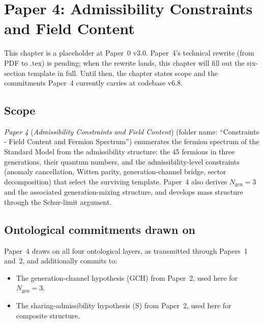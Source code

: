 \documentclass[11pt]{article}
\newcommand{\paperref}[2]{\emph{Paper #1} (\emph{#2})}
\begin{document}
\clearpage

\section{Paper 4: Admissibility Constraints and Field Content}\label{sec:P4}

\begin{tcolorbox}[pendingbox, title={Status: placeholder chapter}]
This chapter is a placeholder at Paper~0 v3.0. Paper~4's technical rewrite (from PDF to .tex) is pending; when the rewrite lands, this chapter will fill out the six-section template in full. Until then, the chapter states scope and the commitments Paper~4 currently carries at codebase v6.8.
\end{tcolorbox}

\subsection{Scope}\label{sec:P4_scope}

\paperref{4}{Admissibility Constraints and Field Content} (folder name: ``Constraints - Field Content and Fermion Spectrum'') enumerates the fermion spectrum of the Standard Model from the admissibility structure: the 45 fermions in three generations, their quantum numbers, and the admissibility-level constraints (anomaly cancellation, Witten parity, generation-channel bridge, sector decomposition) that select the surviving template. Paper~4 also derives $N_{\mathrm{gen}} = 3$ and the associated generation-mixing structure, and develops mass structure through the Schur-limit argument.

\subsection{Ontological commitments drawn on}\label{sec:P4_commitments}

Paper~4 draws on all four ontological layers, as transmitted through Papers~1 and~2, and additionally commits to:

\begin{itemize}
    \item The generation-channel hypothesis (GCH) from Paper~2, used here for $N_{\mathrm{gen}} = 3$.
    \item The sharing-admissibility hypothesis (S) from Paper~2, used here for composite structure.
\end{itemize}
\end{document}
